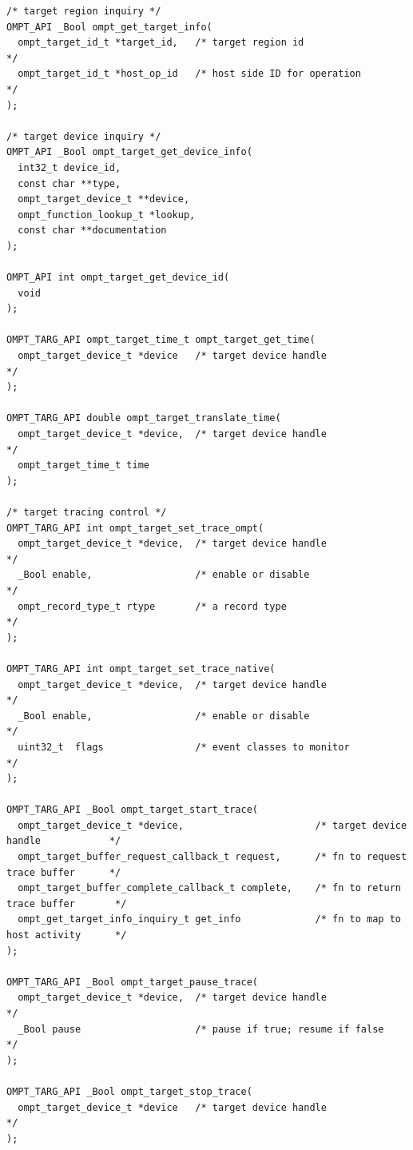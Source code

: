 \documentclass{article}
\begin{document}
\begin{lstlisting}
/* target region inquiry */
OMPT_API _Bool ompt_get_target_info(
  ompt_target_id_t *target_id,   /* target region id                                     */
  ompt_target_id_t *host_op_id   /* host side ID for operation                           */
);

/* target device inquiry */
OMPT_API _Bool ompt_target_get_device_info(
  int32_t device_id, 
  const char **type, 
  ompt_target_device_t **device,
  ompt_function_lookup_t *lookup,
  const char **documentation
);

OMPT_API int ompt_target_get_device_id(
  void
);

OMPT_TARG_API ompt_target_time_t ompt_target_get_time( 
  ompt_target_device_t *device   /* target device handle                                 */
);

OMPT_TARG_API double ompt_target_translate_time(
  ompt_target_device_t *device,  /* target device handle                                 */
  ompt_target_time_t time
);

/* target tracing control */
OMPT_TARG_API int ompt_target_set_trace_ompt(
  ompt_target_device_t *device,  /* target device handle                                 */
  _Bool enable,                  /* enable or disable                                    */
  ompt_record_type_t rtype       /* a record type                                        */
);

OMPT_TARG_API int ompt_target_set_trace_native(
  ompt_target_device_t *device,  /* target device handle                                 */
  _Bool enable,                  /* enable or disable                                    */
  uint32_t  flags                /* event classes to monitor                             */
);

OMPT_TARG_API _Bool ompt_target_start_trace(
  ompt_target_device_t *device,                       /* target device handle            */
  ompt_target_buffer_request_callback_t request,      /* fn to request trace buffer      */
  ompt_target_buffer_complete_callback_t complete,    /* fn to return trace buffer       */
  ompt_get_target_info_inquiry_t get_info             /* fn to map to host activity      */
);

OMPT_TARG_API _Bool ompt_target_pause_trace(
  ompt_target_device_t *device,  /* target device handle                                 */
  _Bool pause                    /* pause if true; resume if false                       */
);

OMPT_TARG_API _Bool ompt_target_stop_trace(
  ompt_target_device_t *device   /* target device handle                                 */
);


\end{lstlisting}
\end{document}
